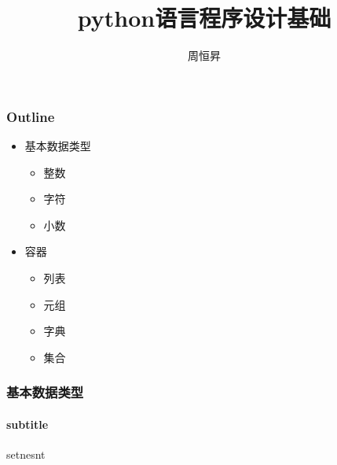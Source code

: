 \documentclass{beamer}
\title{python语言程序设计基础}
\author{周恒昇}
\institute{西亚斯学院}
\begin{document}
\begin{frame}
	\frametitle{Outline}
	\begin{itemize}
		\item 基本数据类型
			\begin{itemize}
				\item 整数
				\item 字符
				\item 小数
			\end{itemize}  
		\item  容器
			\begin{itemize}
				\item 列表
				\item 元组
				\item 字典
				\item 集合
			\end{itemize}
	\end{itemize}
\end{frame}
\begin{frame}
	\frametitle{基本数据类型}
	\framesubtitle{subtitle}
	setnesnt
	
\end{frame}
\end{document}
